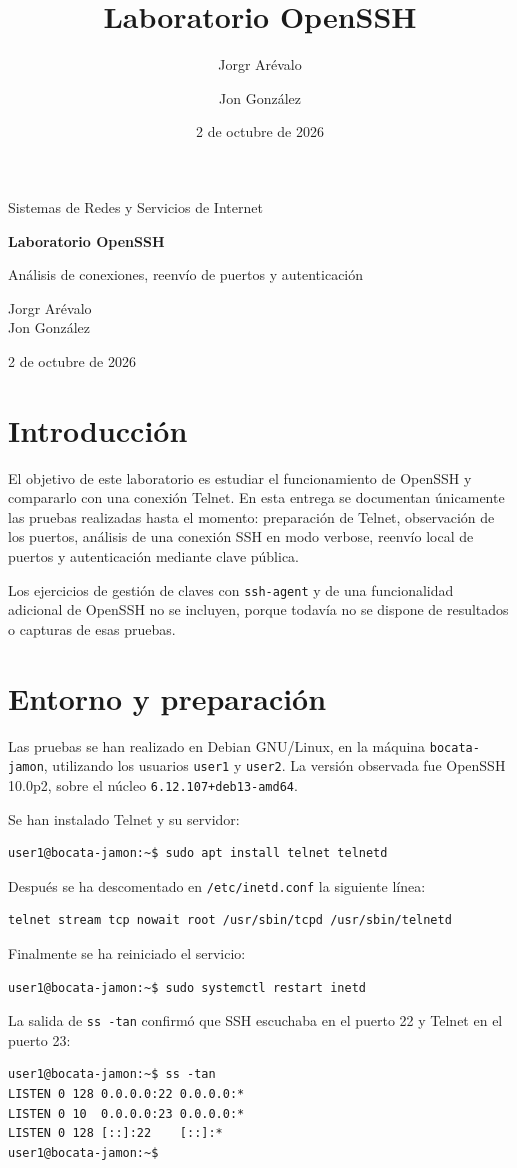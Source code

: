 \documentclass[11pt,a4paper]{article}
\title{Laboratorio OpenSSH}
\author{Jorgr Arévalo \and Jon González}
\date{2 de octubre de 2026}
\begin{document}
\begin{titlepage}
  \centering
  \vspace*{2cm}
  {\Large Sistemas de Redes y Servicios de Internet\par}
  \vspace{1.5cm}
  {\Huge\bfseries Laboratorio OpenSSH\par}
  \vspace{1cm}
  {\large Análisis de conexiones, reenvío de puertos y autenticación\par}
  \vfill
  {\large Jorgr Arévalo\\Jon González\par}
  \vspace{0.8cm}
  {\large 2 de octubre de 2026\par}
\end{titlepage}
\tableofcontents
\newpage

\section{Introducción}
El objetivo de este laboratorio es estudiar el funcionamiento de OpenSSH y
compararlo con una conexión Telnet. En esta entrega se documentan únicamente
las pruebas realizadas hasta el momento: preparación de Telnet, observación de
los puertos, análisis de una conexión SSH en modo verbose, reenvío local de
puertos y autenticación mediante clave pública.

Los ejercicios de gestión de claves con \texttt{ssh-agent} y de una
funcionalidad adicional de OpenSSH no se incluyen, porque todavía no se dispone
de resultados o capturas de esas pruebas.

\section{Entorno y preparación}
Las pruebas se han realizado en Debian GNU/Linux, en la máquina
\texttt{bocata-jamon}, utilizando los usuarios \texttt{user1} y
\texttt{user2}. La versión observada fue OpenSSH 10.0p2, sobre el núcleo
\texttt{6.12.107+deb13-amd64}.

Se han instalado Telnet y su servidor:
\begin{lstlisting}[language=bash]
user1@bocata-jamon:~$ sudo apt install telnet telnetd
\end{lstlisting}
Después se ha descomentado en \texttt{/etc/inetd.conf} la siguiente línea:
\begin{lstlisting}
telnet stream tcp nowait root /usr/sbin/tcpd /usr/sbin/telnetd
\end{lstlisting}
Finalmente se ha reiniciado el servicio:
\begin{lstlisting}[language=bash]
user1@bocata-jamon:~$ sudo systemctl restart inetd
\end{lstlisting}
La salida de \texttt{ss -tan} confirmó que SSH escuchaba en el puerto 22 y
Telnet en el puerto 23:
\begin{lstlisting}
user1@bocata-jamon:~$ ss -tan
LISTEN 0 128 0.0.0.0:22 0.0.0.0:*
LISTEN 0 10  0.0.0.0:23 0.0.0.0:*
LISTEN 0 128 [::]:22    [::]:*
user1@bocata-jamon:~$
\end{lstlisting}
\end{document}
